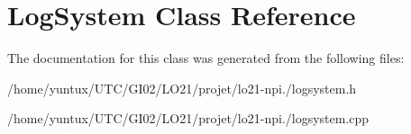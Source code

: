 \hypertarget{class_log_system}{\section{\-Log\-System \-Class \-Reference}
\label{class_log_system}
}


\-The documentation for this class was generated from the following files\-:\begin{DoxyCompactItemize}
\item 
/home/yuntux/\-U\-T\-C/\-G\-I02/\-L\-O21/projet/lo21-\/npi./logsystem.\-h\item 
/home/yuntux/\-U\-T\-C/\-G\-I02/\-L\-O21/projet/lo21-\/npi./logsystem.\-cpp\end{DoxyCompactItemize}
